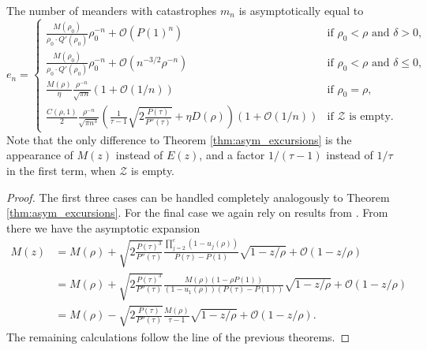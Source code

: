 \begin{theorem}
\label{thm:asym_meanders}
  The number of meanders with catastrophes $m_n$ is asymptotically equal to
  \begin{equation} \label{eq:meanders_asymptotics}
    e_n = 
    \begin{cases}
      \frac{M(\rho_0)}{\rho_0 \cdot Q'(\rho_0)} \rho_0^{-n} + 
      \mathcal{O}(P(1)^n) & 
      \text{if $\rho_0 < \rho$ and $\delta > 0$}, \\[8pt]
      \frac{M(\rho_0)}{\rho_0 \cdot Q'(\rho_0)} \rho_0^{-n} + 
      \mathcal{O}(n^{-3/2}\rho^{-n}) & 
      \text{if $\rho_0 < \rho$ and $\delta \leq 0$}, \\[8pt]
      \frac{M(\rho)}{\eta}\frac{\rho^{-n}}{\sqrt{\pi n}}
      \left(1 + \mathcal{O}\left(1/n\right)\right) & 
      \text{if $\rho_0 = \rho$}, \\[8pt]
      \frac{C(\rho,1)}{2}\frac{\rho^{-n}}{\sqrt{\pi n^3}}
      \left(\frac{1}{\tau - 1}\sqrt{2\frac{P(\tau)}{P''(\tau)}} + \eta D(\rho)\right)
      \left(1 + \mathcal{O}\left(1/n\right)\right) & 
      \text{if $\mathcal{Z}$ is empty.}
    \end{cases}
  \end{equation}
  Note that the only difference to Theorem \ref{thm:asym_excursions} is the appearance of $M(z)$ instead of $E(z)$, and a factor $1/(\tau - 1)$ instead of $1/\tau$ in the first term, when $\mathcal{Z}$ is empty.
\end{theorem}

\begin{proof}
  The first three cases can be handled completely analogously to Theorem \ref{thm:asym_excursions}. For the final case we again rely on results from \cite[Theorem 4]{Basic}. From there we have the asymptotic expansion
  \begin{align*}
    M(z) &= M(\rho) + \sqrt{2\frac{P(\tau)^3}{P''(\tau)}}\frac{\prod_{j=2}^c (1 - u_j(\rho))}{P(\tau) - P(1)}\sqrt{1 - z/\rho} + \mathcal{O}(1 - z/\rho) \\
    &= M(\rho) + \sqrt{2\frac{P(\tau)^3}{P''(\tau)}}\frac{M(\rho)(1 - \rho P(1))}{(1 - u_1(\rho))(P(\tau) - P(1))}\sqrt{1 - z/\rho} + \mathcal{O}(1 - z/\rho) \\
    &= M(\rho) - \sqrt{2\frac{P(\tau)}{P''(\tau)}}\frac{M(\rho)}{\tau - 1}\sqrt{1 - z/\rho} + \mathcal{O}(1 - z/\rho).
  \end{align*}
  The remaining calculations follow the line of the previous theorems.
\end{proof}

